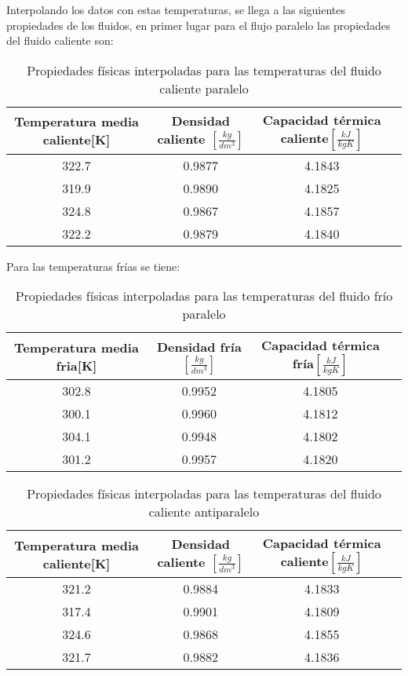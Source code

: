 \documentclass[letterpaper,11pt]{article} %
\begin{document}
Interpolando los datos con estas temperaturas, se llega a las siguientes propiedades de los fluidos, en primer lugar para el flujo paralelo las propiedades del fluido caliente son:
\begin{table}[htbp]
    \centering
    \caption{Propiedades físicas interpoladas para las temperaturas del fluido caliente paralelo}
    \begin{tabular}{c|c|c|c|}
    
        Temperatura media caliente[K]&Densidad caliente $[\frac{kg}{dm^3}]$ & Capacidad térmica caliente$[\frac{kJ}{kgK}]$\\
        \hline
        322.7 & 0.9877 & 4.1843\\
        319.9 & 0.9890 & 4.1825\\
        324.8 & 0.9867 & 4.1857\\
        322.2 & 0.9879 & 4.1840 \\
    \end{tabular}
    \label{tab:propcalienteparalelo}
\end{table}
\newp
Para las temperaturas frías se tiene:
\begin{table}[htbp]
    \centering
    \caption{Propiedades físicas interpoladas para las temperaturas del fluido frío paralelo}
    \begin{tabular}{c|c|c|c|}
    
        Temperatura media fria[K]&Densidad fría $[\frac{kg}{dm^3}]$ & Capacidad térmica fría$[\frac{kJ}{kgK}]$\\
        \hline
        302.8 & 0.9952 & 4.1805\\
        300.1 & 0.9960 & 4.1812\\
        304.1 & 0.9948 & 4.1802\\
        301.2 & 0.9957 & 4.1820 \\
    \end{tabular}
    \label{tab:propfriaparalelo}
\end{table}
\newp
\begin{table}[htbp]
    \centering
    \caption{Propiedades físicas interpoladas para las temperaturas del fluido caliente antiparalelo}
    \begin{tabular}{c|c|c|c|}
    
        Temperatura media caliente[K]&Densidad caliente $[\frac{kg}{dm^3}]$ & Capacidad térmica caliente$[\frac{kJ}{kgK}]$\\
        \hline
        321.2 & 0.9884 & 4.1833\\
        317.4 & 0.9901 & 4.1809\\
        324.6 & 0.9868 & 4.1855\\
        321.7 & 0.9882 & 4.1836 \\
    \end{tabular}
    \label{tab:propcalienteantiparalelo}
\end{table}
\end{document}
